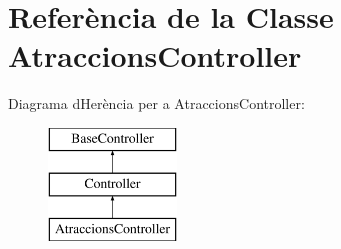 \hypertarget{class_app_1_1_http_1_1_controllers_1_1_atraccions_controller}{}\section{Referència de la Classe Atraccions\+Controller}
\label{class_app_1_1_http_1_1_controllers_1_1_atraccions_controller}
Diagrama d\textquotesingle{}Herència per a Atraccions\+Controller\+:\begin{figure}[H]
\begin{center}
\leavevmode
\includegraphics[height=3.000000cm]{class_app_1_1_http_1_1_controllers_1_1_atraccions_controller}
\end{center}
\end{figure}
